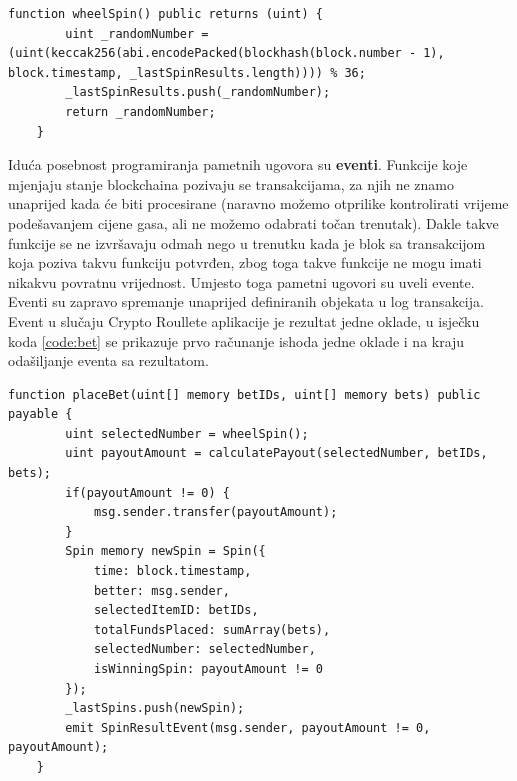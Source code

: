\documentclass[a4paper,oneside,12pt]{memoir} %
\begin{document}
\begin{lstlisting}[caption=Crypto Roulette funkcija koja imitira generaciju brojeva pomoću hash funkcije keccak256 (SHA256) i nije sigurna za stvarnu upotrebu.]
function wheelSpin() public returns (uint) {
        uint _randomNumber = (uint(keccak256(abi.encodePacked(blockhash(block.number - 1), block.timestamp, _lastSpinResults.length)))) % 36;
        _lastSpinResults.push(_randomNumber);
        return _randomNumber;
    }
\end{lstlisting}

Iduća posebnost programiranja pametnih ugovora su \textbf{eventi}. Funkcije koje mjenjaju stanje blockchaina pozivaju se transakcijama, za njih ne znamo unaprijed kada će biti procesirane (naravno možemo otprilike kontrolirati vrijeme podešavanjem cijene gasa, ali ne možemo odabrati točan trenutak). Dakle takve funkcije se ne izvršavaju odmah nego u trenutku kada je blok sa transakcijom koja poziva takvu funkciju potvrđen, zbog toga takve funkcije ne mogu imati nikakvu povratnu vrijednost. Umjesto toga pametni ugovori su uveli evente. Eventi su zapravo spremanje unaprijed definiranih objekata u log transakcija. Event u slučaju Crypto Roullete aplikacije je rezultat jedne oklade, u isječku koda \ref{code:bet} se prikazuje prvo računanje ishoda jedne oklade i na kraju odašiljanje eventa sa rezultatom.

\begin{lstlisting}[caption=Funkcija koja se pokreće prilikom slanja transakcije koja sadrži podatke za igru jedne runde ruleta. Argumenti funkcije su polje \lstinline{betIDs} sa okladama i polje \lstinline{bets} sa iznosima za okladu. Na početku vidimo generaciju broja i računanje dobitka. Tada pametni ugovor\, ako ima dobitka\, u liniji \lstinline{msg.sender.transfer(payoutAmount)} prebacuje dobitnu količinu ethera na adresu igrača. Sve prethodne oklade se čuvaju u polju (primjetimo da je to loš način zapravo\, jer nakon nekog vremena polje će zauzimati mnogo memorije\, pa će i cijena oklade biti skuplja.) U zadnjoj liniji se odašilje event koji se prikazuje na ekranu kao na slici \ref{fig:result}, label={code:bet}]
    function placeBet(uint[] memory betIDs, uint[] memory bets) public payable {
        uint selectedNumber = wheelSpin();
        uint payoutAmount = calculatePayout(selectedNumber, betIDs, bets);
        if(payoutAmount != 0) {
            msg.sender.transfer(payoutAmount);
        }
        Spin memory newSpin = Spin({
            time: block.timestamp,
            better: msg.sender,
            selectedItemID: betIDs,
            totalFundsPlaced: sumArray(bets),
            selectedNumber: selectedNumber,
            isWinningSpin: payoutAmount != 0
        });
        _lastSpins.push(newSpin);
        emit SpinResultEvent(msg.sender, payoutAmount != 0, payoutAmount);
    }
\end{lstlisting}
\end{document}
